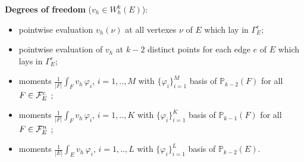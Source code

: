 \documentclass[a4paper,11pt]{article}
\theoremstyle{remark}
\theoremstyle{definition}
\newcommand{\Pol}{\mathbb{P}}
\begin{document}
\smallskip\noindent
{\bf Degrees of freedom} ($v_h \in W_h^k(E)$):
\begin{itemize}
\item pointwise evaluation $v_h(\nu)$ at all vertexes $\nu$ of $E$ which lay in $\Gamma^c_E$;
\vspace{-2mm}
\item pointwise evaluation of $v_h$ at $k-2$ distinct points for each edge $e$ of $E$ which lays in $\Gamma^c_E$;
\vspace{-2mm}
\item moments $\frac{1}{|F|} \int_F v_h \, \varphi_i$, $i=1,..,M$ with $\{ \varphi_i\}_{i=1}^M$ basis of $\Pol_{k-2}(F)$ for all $F \in {\cal F}^c_E$ ;
\vspace{-2mm}
\item moments $\frac{1}{|F|} \int_F v_h \, \varphi_i$, $i=1,..,K$ with $\{ \varphi_i\}_{i=1}^K$ basis of $\Pol_{k-1}(F)$ for all $F \in {\cal F}^n_E$ ;
\vspace{-2mm}
\item moments $\frac{1}{|E|} \int_E v_h \, \varphi_i$, $i=1,..,L$ with $\{ \varphi_i\}_{i=1}^L$ basis of $\Pol_{k-2}(E)$.
\end{itemize}
\end{document}
